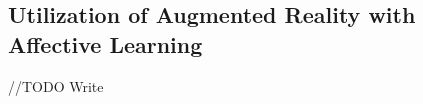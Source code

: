 \subsection{Utilization of Augmented Reality with Affective Learning}
//TODO Write


\begin{comment}
    
\subsection{Popularity of Video Games}

    Video Games are a ubiquitous concept in modern times. Video games have taken over the world in terms of popularity; its scope reaching the whole world in its usage. As of 2022, there are  3.03 Billion players worldwide \cite{enterpriseappstoday2023}. In a specific look,  Steam, one of the biggest video game distributors online has had a rapid rise of player base. From 2012 till December 2020 the average number of players per hour playing through Steam went from around 100 thousand in the first 12 months to 500 thousand on December of 2020 \cite{Mendes2022}. As of 2024, Steam has about 36 Million  peak players, with player numbers never dropping below 20 Million \cite{SteamCharts}.

    With the widespread use and popularity of video games, there were many studies done around video games; aiming to understand how games affect players and how to use or harness video games in other aspects or industries. One of the most promising applications is by combining video games and learning. One of the words connected with education in students is "boring" ; this causes trouble for both students and teachers alike since the feeling of boredom reduces student understanding and motivation \cite{mora}. This lack of understanding and motivation to learn can lead to lesser grades and deteriorating student performance. On the other hand, looking at video games, the opposite is shown. Games are fun, and they are fun due to multiple reasons which adds to the player's immersion and motivation to learn the game and keep playing \cite{malone1980fun}. 

    If one could combine the lackluster environment of school and the addictive fun of video games, then the result would be a way to keep students interested and motivated to learn all while increasing their performance in terms of educational attainment. A guide book has been made for this specifically. "Gaming the Past" is a book teaching teachers how to use video games to supplement history lessons \cite{mccall2022gaming} . One example in the book is using the game "Civilization" to supplement learning resource management through history; the main goal of games, in the book, is to show a different perspective or capture a specific aspect of history that cannot be shown through normal educational materials alone \cite{mccall2022gaming}. This is an amazing discovery that helps both teachers and students in a win-win scenario. This then begs the question, can this concept be studied further?


\end{comment}
